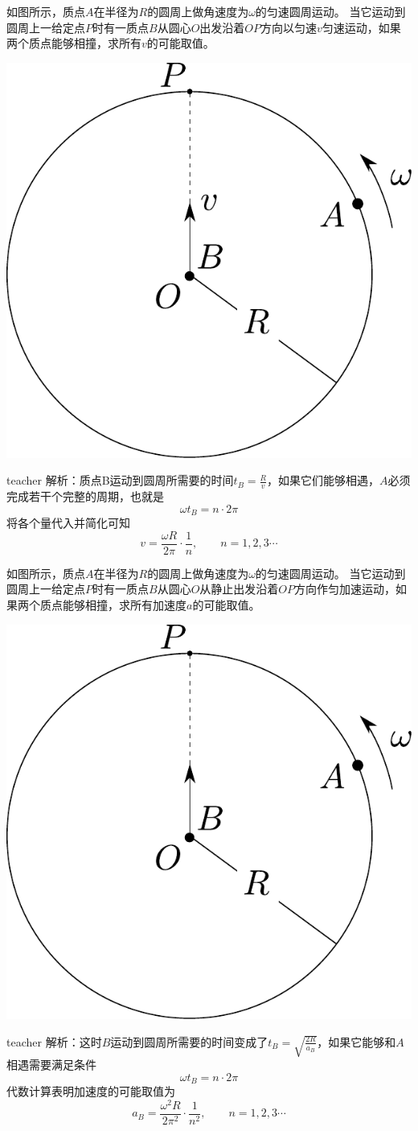 \begin{example}
如图所示，质点$A$在半径为$R$的圆周上做角速度为$\omega$的匀速圆周运动。
当它运动到圆周上一给定点$P$时有一质点$B$从圆心$O$出发沿着$OP$方向以匀速$v$匀速运动，如果两个质点能够相撞，求所有$v$的可能取值。
\begin{flushright}
\includegraphics[width = 0.3
\textwidth]{images/motion-problem-9.pdf} 
\end{flushright}
\begin{taggedblock}{teacher}
\noindent
解析：质点B运动到圆周所需要的时间$t_B = \frac{R}{v}$，如果它们能够相遇，$A$必须完成若干个完整的周期，也就是
\[
\omega t_B = n\cdot 2\pi
\]
将各个量代入并简化可知
\[
v = \frac{\omega R}{2\pi}\cdot\frac{1}{n},\qquad n=1,2,3\cdots
\]
\end{taggedblock}
\end{example}





\begin{example}
如图所示，质点$A$在半径为$R$的圆周上做角速度为$\omega$的匀速圆周运动。
当它运动到圆周上一给定点$P$时有一质点$B$从圆心$O$从静止出发沿着$OP$方向作匀加速运动，如果两个质点能够相撞，求所有加速度$a$的可能取值。
\begin{flushright}
\includegraphics[width = 0.3
\textwidth]{images/motion-problem-10.pdf} 
\end{flushright}
\begin{taggedblock}{teacher}
\noindent
解析：这时$B$运动到圆周所需要的时间变成了$t_B = \sqrt{\frac{2R}{a_B}}$，如果它能够和$A$相遇需要满足条件
\[
\omega t_B = n\cdot 2\pi
\]
代数计算表明加速度的可能取值为
\[
a_B = \frac{\omega^2R}{2\pi^2}\cdot\frac{1}{n^2},\qquad n=1,2,3\cdots
\]
\end{taggedblock}
\end{example}

